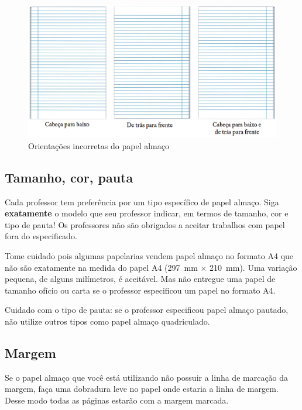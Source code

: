 \begin{figure}[H]
\centering
\caption{Orientações incorretas do papel almaço}
\label{fig:orienterrado}
\vspace{-0.3cm}
\includegraphics[scale=0.3]{imagens/orienterrado.png}
\end{figure}


\subsection{Tamanho, cor, pauta}
\label{sec:como-a4}

Cada professor tem preferência por um tipo específico de papel almaço. Siga
\textbf{exatamente} o modelo que seu professor indicar, em termos de tamanho,
cor e tipo de pauta! Os professores não são obrigados a aceitar trabalhos com
papel fora do especificado.

Tome cuidado pois algumas papelarias vendem papel almaço no formato A4 que não
são exatamente na medida do papel A4 (\qty{297}{\milli\meter} $\times$
\qty{210}{\milli\meter}). Uma variação pequena, de alguns milímetros, é
aceitável. Mas não entregue uma papel de tamanho ofício ou carta se o professor
especificou um papel no formato A4.

Cuidado com o tipo de pauta: se o professor especificou papel almaço pautado,
não utilize outros tipos como papel almaço quadriculado.


\subsection{Margem}
\label{sec:como-margem}

Se o papel almaço que você está utilizando não possuir a linha de marcação da
margem, faça uma dobradura leve no papel onde estaria a linha de margem. Desse
modo todas as páginas estarão com a margem marcada.



